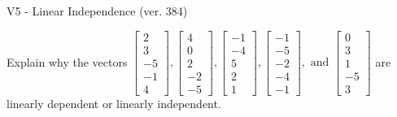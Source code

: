 \begin{exercise}
  \begin{exerciseTitle}V5 - Linear Independence (ver. 384)\end{exerciseTitle}
  \begin{exerciseStatement}
    Explain why the vectors \(\left[\begin{array}{r}
2 \\
3 \\
-5 \\
-1 \\
4
\end{array}\right] , \left[\begin{array}{r}
4 \\
0 \\
2 \\
-2 \\
-5
\end{array}\right] , \left[\begin{array}{r}
-1 \\
-4 \\
5 \\
2 \\
1
\end{array}\right] , \left[\begin{array}{r}
-1 \\
-5 \\
-2 \\
-4 \\
-1
\end{array}\right] , \text{ and } \left[\begin{array}{r}
0 \\
3 \\
1 \\
-5 \\
3
\end{array}\right]\) are linearly dependent or linearly independent.	



\end{exerciseStatement}
\end{exercise}
